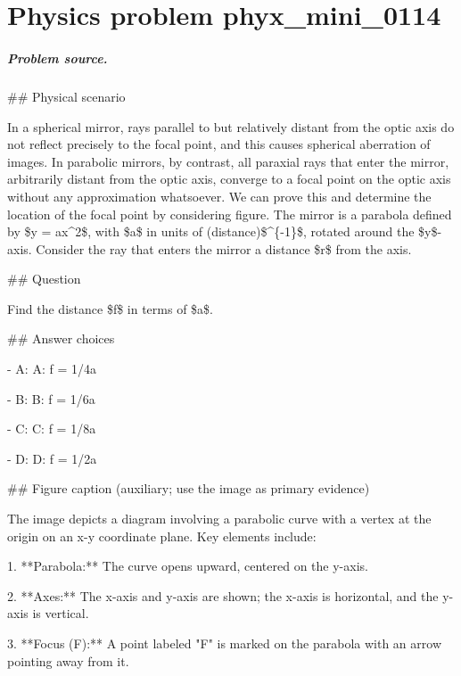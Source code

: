 
\chapter{Physics problem phyx\_mini\_0114}
\label{ch:PhyXMiniProblems_problem_phyx_mini_0114}

\paragraph{Problem source.}
\#\# Physical scenario

In a spherical mirror, rays parallel to but relatively distant from the optic axis do not reflect precisely to the focal point, and this causes spherical aberration of images. In parabolic mirrors, by contrast, all paraxial rays that enter the mirror, arbitrarily distant from the optic axis, converge to a focal point on the optic axis without any approximation whatsoever. We can prove this and determine the location of the focal point by considering figure. The mirror is a parabola defined by \$y = ax\textasciicircum{}2\$, with \$a\$ in units of (distance)\$\textasciicircum{}\{-1\}\$, rotated around the \$y\$-axis. Consider the ray that enters the mirror a distance \$r\$ from the axis.

\#\# Question

Find the distance \$f\$ in terms of \$a\$.

\#\# Answer choices

- A: A: f = 1/4a

- B: B: f = 1/6a

- C: C: f = 1/8a

- D: D: f = 1/2a

\#\# Figure caption (auxiliary; use the image as primary evidence)

The image depicts a diagram involving a parabolic curve with a vertex at the origin on an x-y coordinate plane. Key elements include:

1. **Parabola:** The curve opens upward, centered on the y-axis.

2. **Axes:** The x-axis and y-axis are shown; the x-axis is horizontal, and the y-axis is vertical.

3. **Focus (F):** A point labeled "F" is marked on the parabola with an arrow pointing away from it.

